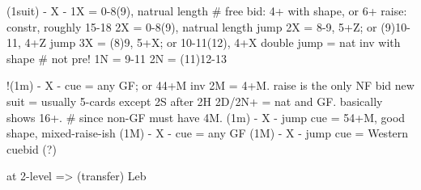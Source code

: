 (1suit) - X -
1X = 0-8(9), natrual length  # free bid: 4+ with shape, or 6+
    raise: constr, roughly 15-18
2X = 0-8(9), natrual length
jump 2X = 8-9, 5+Z; or (9)10-11, 4+Z
jump 3X = (8)9, 5+X; or 10-11(12), 4+X
double jump = nat inv with shape  # not pre!
1N = 9-11
2N = (11)12-13

!(1m) - X - cue = any GF; or 44+M inv 
    2M = 4+M. raise is the only NF bid 
        new suit = usually 5-cards except 2S after 2H
    2D/2N+ = nat and GF. basically shows 16+.  # since non-GF must have 4M.
(1m) - X - jump cue = 54+M, good shape, mixed-raise-ish
(1M) - X - cue = any GF
(1M) - X - jump cue = Western cuebid (?)

at 2-level => (transfer) Leb